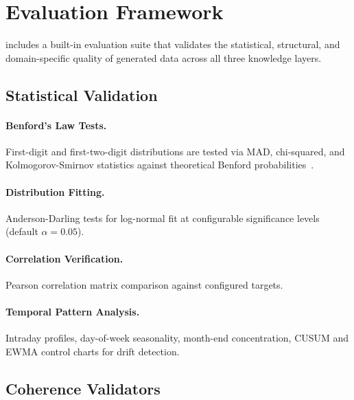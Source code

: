\section{Evaluation Framework}
\label{sec:evaluation}

\system{} includes a built-in evaluation suite that validates the
statistical, structural, and domain-specific quality of generated
data across all three knowledge layers.

\subsection{Statistical Validation}
\label{sec:eval_statistical}

\paragraph{Benford's Law Tests.}
First-digit and first-two-digit distributions are tested via MAD,
chi-squared, and Kolmogorov-Smirnov statistics against theoretical
Benford probabilities~\citep{nigrini2012benfords}.

\paragraph{Distribution Fitting.}
Anderson-Darling tests for log-normal fit at configurable significance
levels (default $\alpha = 0.05$).

\paragraph{Correlation Verification.}
Pearson correlation matrix comparison against configured targets.

\paragraph{Temporal Pattern Analysis.}
Intraday profiles, day-of-week seasonality, month-end concentration,
CUSUM and EWMA control charts for drift detection.

\subsection{Coherence Validators}
\label{sec:eval_coherence}

